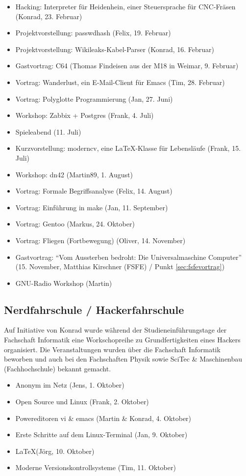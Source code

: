 \documentclass[10pt,DIV16]{scrartcl}
\begin{document}
\begin{itemize}
	\item Hacking:  Interpreter für Heidenhein, einer Steuersprache für CNC-Fräsen (Konrad, 23. Februar)
	\item Projektvorstellung:  passwdhash (Felix, 19. Februar)
	\item Projektvorstellung:  Wikileaks-Kabel-Parser (Konrad, 16. Februar)
	\item Gastvortrag:  C64 (Thomas Findeisen aus der M18 in Weimar, 9. Februar)
	\item Vortrag:  Wanderlust, ein E-Mail-Client für Emacs (Tim, 28. Februar)
	\item Vortrag: Polyglotte Programmierung  (Jan, 27. Juni)
	\item Workshop:  Zabbix + Postgres (Frank, 4. Juli)
	\item Spieleabend (11. Juli)
	\item Kurzvorstellung: moderncv, eine \LaTeX-Klasse für Lebensläufe (Frank, 15. Juli)
	\item Workshop:  dn42 (Martin89, 1. August)
	\item Vortrag:  Formale Begriffsanalyse (Felix, 14. August)
	\item Vortrag:  Einführung in make (Jan, 11. September)
	\item Vortrag:  Gentoo (Markus, 24. Oktober)
	\item Vortrag:  Fliegen (Fortbewegung) (Oliver, 14. November)
	\item Gastvortrag:  "`Vom Aussterben bedroht: Die Universalmaschine Computer"'
		(15. November, Matthias Kirschner (FSFE) / Punkt \ref{sec:fsfevortrag})
	\item GNU-Radio Workshop (Martin)
\end{itemize}

\subsection{Nerdfahrschule / Hackerfahrschule}

Auf Initiative von Konrad wurde während der Studieneinführungstage der
Fachschaft Informatik eine Workschopreihe zu Grundfertigkeiten eines Hackers
organisiert.  Die Veranstaltungen wurden über die Fachschaft Informatik
beworben und auch bei den Fachschaften Physik sowie SciTec \& Maschinenbau
(Fachhochschule) bekannt gemacht.

\begin{itemize}
	\item Anonym im Netz (Jens, 1. Oktober)
	\item Open Source und Linux (Frank, 2. Oktober)
	\item Powereditoren vi \& emacs (Martin \& Konrad, 4. Oktober)
	\item Erste Schritte auf dem Linux-Terminal (Jan, 9. Oktober)
	\item \LaTeX (Jörg, 10. Oktober)
	\item Moderne Versionskontrollsysteme (Tim, 11. Oktober)
\end{itemize}
\end{document}
